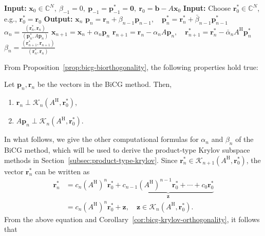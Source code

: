 \begin{algorithm}[H]\caption{{The BiCG method}}\label{alg:bicg}\begin{algorithmic}[1]
\Statex\textbf{Input:} $\bm x_0\in\mathbb C^N,\ \beta_{-1}=0,\ \bm p_{-1}=\bm p_{-1}^{*}=\bm0,\ \bm r_0=\bm b-A\bm x_0$
\Statex\textbf{Input:} {Choose $\bm r_0^{*}\in\mathbb C^N$, e.g., $\bm r_0^{*}=\bm r_0$}
\Statex\textbf{Output:} $\bm x_n$
\State $\bm p_n=\bm r_n+\beta_{n-1}\bm p_{n-1},\quad\bm p_n^{*}=\bm r_n^{*}+\bar\beta_{n-1}\bm p_{n-1}^{*}$
\State $\alpha_n=\frac{(\bm r_n^{*},\bm r_n)}{(\bm p_n^{*},A\bm p_n)}$
\State $\bm x_{n+1}=\bm x_n+\alpha_n\bm p_n$
\State $\bm r_{n+1}=\bm r_n-\alpha_nA\bm p_n,\quad\bm r_{n+1}^{*}=\bm r_n^{*}-\bar\alpha_nA^{\mathrm H}\bm p_n^{*}$
\State $\beta_n=\frac{(\bm r_{n+1}^{*},\bm r_{n+1})}{(\bm r_n^{*},\bm r_n)}$
\EndFor\end{algorithmic}\end{algorithm}
{From Proposition\ \ref{prop:bicg-biorthogonality}, the following properties hold true:}
\par{}
\begin{Corollary}\label{cor:bicg-krylov-orthogonality}
{Let $\bm p_n,\bm r_n$ be the vectors in the BiCG method. Then,}
\begin{enumerate}\item $\bm r_n\perp\mathcal K_n(A^{\mathrm H},\bm r_0^{*})$,\item $A\bm p_n\perp\mathcal K_n(A^{\mathrm H},\bm r_0^{*})$.\end{enumerate}
\end{Corollary}
{In what follows, we give the other computational formulas for $\alpha_n$ and $\beta_n$ of the BiCG method, which will be used to derive the product-type Krylov subspace methods in Section\ \ref{subsec:product-type-krylov}.}
{Since $\bm r_n^{*}\in\mathcal K_{n+1}(A^{\mathrm H},\bm r_0^{*})$, the vector $\bm r_n^{*}$ can be written as}
\[\begin{aligned}\bm r_n^{*}&=c_n(A^{\mathrm H})^n\bm r_0^{*}+\underbrace{c_{n-1}(A^{\mathrm H})^{n-1}\bm r_0^{*}+\cdots+c_0\bm r_0^{*}}_{\bm z}\\&=c_n(A^{\mathrm H})^n\bm r_0^{*}+\bm z,\quad\bm z\in\mathcal K_n(A^{\mathrm H},\bm r_0^{*}).\end{aligned}\]
{From the above equation and Corollary\ \ref{cor:bicg-krylov-orthogonality}, it follows that}
